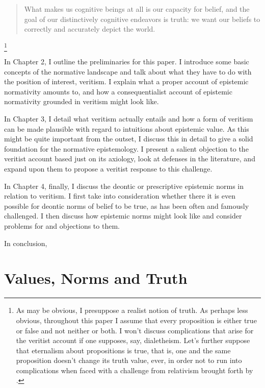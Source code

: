 \documentclass[12pt,numbers=noenddot]{scrartcl}
\begin{document}
\begin{quote}
What makes us cognitive beings at all is our capacity for belief, and the goal of our distinctively cognitive endeavors is truth: we want our beliefs to correctly and accurately depict the world. \textcite[7]{Bonjour1985}
\end{quote}

\footnote{As may be obvious, I presuppose a realist notion of truth. As perhaps less obvious, throughout this paper I assume that every proposition is either true or false and not neither or both. I won't discuss complications that arise for the veritist account if one supposes, say, dialetheism. Let's further suppose that eternalism about propositions is true, that is, one and the same proposition doesn't change its truth value, ever, in order not to run into complications when faced with a challenge from relativism brought forth by \textcite{Brogaard2008-BROTTA-3}.}

In Chapter 2, I outline the preliminaries for this paper. I introduce some basic concepts of the normative landscape and talk about what they have to do with the position of interest, veritism. I explain what a proper account of epistemic normativity amounts to, and how a consequentialist account of epistemic normativity grounded in veritism might look like.

In Chapter 3, I detail what veritism actually entails and how a form of veritism can be made plausible with regard to intuitions about epistemic value. As this might be quite important from the outset, I discuss this in detail to give a solid foundation for the normative epistemology. I present a salient objection to the veritist account based just on its axiology, look at defenses in the literature, and expand upon them to propose a veritist response to this challenge.

In Chapter 4, finally, I discuss the deontic or prescriptive epistemic norms in relation to veritism. I first take into consideration whether there it is even possible for deontic norms of belief to be true, as has been often and famously challenged. I then discuss how epistemic norms might look like and consider problems for and objections to them.

In conclusion,

\section{Values, Norms and Truth}\label{sec:values}
\end{document}
